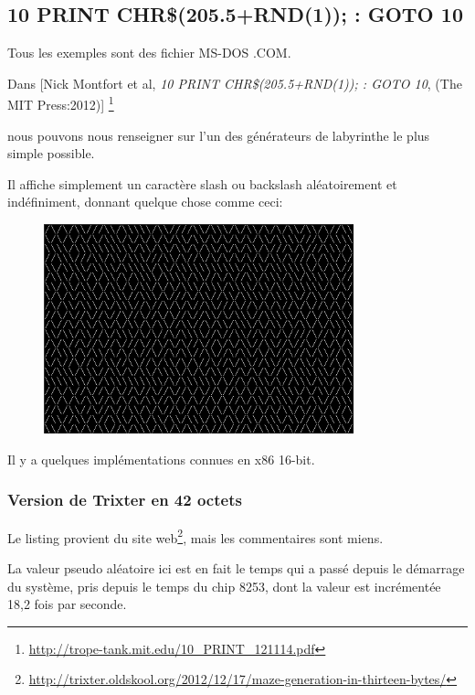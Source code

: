 \subsection{10 PRINT CHR\$(205.5+RND(1)); : GOTO 10}

Tous les exemples sont des fichier MS-DOS .COM.

Dans [Nick Montfort et al, \emph{10 PRINT CHR\$(205.5+RND(1)); : GOTO 10}, (The MIT Press:2012)]
\footnote{\AlsoAvailableAs \url{http://trope-tank.mit.edu/10_PRINT_121114.pdf}}

nous pouvons nous renseigner sur l'un des générateurs de labyrinthe le plus simple
possible.

Il affiche simplement un caractère slash ou backslash aléatoirement et indéfiniment,
donnant quelque chose comme ceci:

\begin{figure}[H]
\centering
\includegraphics[width=0.8\textwidth]{examples/demos/10print/10print.png}
\end{figure}

Il y a quelques implémentations connues en x86 16-bit.

\subsubsection{Version de Trixter en 42 octets}

\newcommand{\FNURLTRIXTER}{\footnote{\url{http://trixter.oldskool.org/2012/12/17/maze-generation-in-thirteen-bytes/}}}

Le listing provient du site web\FNURLTRIXTER, mais les commentaires sont miens.



La valeur pseudo aléatoire ici est en fait le temps qui a passé depuis le démarrage
du système, pris depuis le temps du chip 8253, dont la valeur est incrémentée 18,2
fois par seconde.

